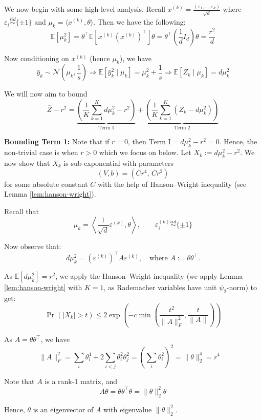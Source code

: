 We now begin with some high-level analysis. Recall $x^{(k)} = \frac{(\varepsilon_1, \ldots, \varepsilon_d)}{\sqrt{d}}$ where $\varepsilon_i\overset{iid}{\sim} \{ \pm 1 \}$ and $ \mu_k = \langle x^{(k)}, \theta \rangle$. Then we have the following:
\[
\mathbb{E}[\mu^2_k] = \theta^\top \mathbb{E}\left[ x^{(k)} (x^{(k)})^\top \right] \theta 
= \theta^\top \left( \frac{1}{d} I_d \right) \theta = \frac{r^2}{d}
\]


Now conditioning on $x^{(k)}$ (hence $\mu_k$), we have
\[
\bar{y}_k \sim \mathcal{N}\left(\mu_k, \frac{1}{s}\right)
\Rightarrow \mathbb{E}[\bar{y}_k^2 \mid \mu_k] = \mu_k^2 + \frac{1}{s}\Rightarrow \mathbb{E}[Z_k \mid \mu_k] = d \mu_k^2
\]




We will now aim to bound
\[
\bar{Z} - r^2 
= \underbrace{\left( \frac{1}{K} \sum_{k=1}^{K} d\mu_k^2 - r^2 \right)}_{\text{Term 1}}
+ \underbrace{\left( \frac{1}{K} \sum_{k=1}^{K} \left( Z_k - d\mu_k^2 \right) \right)}_{\text{Term 2}}
\]

\textbf{Bounding Term 1:}
Note that if $r=0$, then  $\text{Term I}=d \mu_k^2 - r^2=0$. Hence, the non-trivial case is when $r>0$ which we focus on below.
Let $X_k := d \mu_k^2 - r^2$.  
We now show that $X_k$ is sub-exponential with parameters
\[
(V, b) = \left( C r^4, \, C r^2 \right)
\]
for some absolute constant $C$ with the help of Hanson–Wright inequality (see Lemma \ref{lem:hanson-wright}).

Recall that
\[
\mu_k = \left\langle \frac{1}{\sqrt{d}} \varepsilon^{(k)}, \theta \right\rangle,
\qquad \varepsilon_i^{(k)} \overset{iid}{\sim} \{ \pm 1 \}
\]

Now observe that:
\[
d \mu_k^2 = \left( \varepsilon^{(k)} \right)^\top A \varepsilon^{(k)}, \quad \text{where } A := \theta \theta^\top .
\]


As $\mathbb{E}[d \mu_k^2] = r^2$, we apply the Hanson–Wright inequality (we apply Lemma \ref{lem:hanson-wright} with $K = 1$, as Rademacher variables have unit $\psi_2$-norm) to get:
\[
\Pr\left( |X_k| > t \right) 
\leq 2 \exp\left( -c \min\left( \frac{t^2}{\|A\|_F^2}, \frac{t}{\|A\|} \right) \right)
\]

As $A = \theta \theta^\top$, we have
\[
\|A\|_F^2 = \sum_i \theta_i^4 + 2 \sum_{i < j} \theta_i^2 \theta_j^2 
= \left( \sum_i \theta_i^2 \right)^2 = \|\theta\|_2^4 = r^4 
\quad 
\]

Note that $A$ is a rank-1 matrix, and
\[
A \theta = \theta \theta^\top \theta = \|\theta\|_2^2 \theta
\]

Hence, $\theta$ is an eigenvector of $A$ with eigenvalue $\|\theta\|_2^2$.


